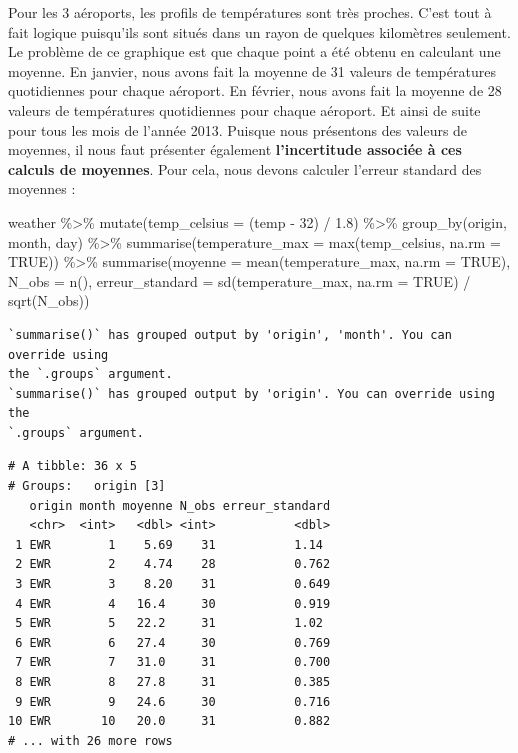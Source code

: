 \documentclass[
  a4paper,
  DIV=11,
  numbers=noendperiod,
  oneside]{scrreprt}
\newenvironment{Shaded}{}{}
\newcommand{\AttributeTok}[1]{\textcolor[rgb]{0.84,0.23,0.29}{#1}}
\newcommand{\ConstantTok}[1]{\textcolor[rgb]{0.00,0.36,0.77}{#1}}
\newcommand{\DecValTok}[1]{\textcolor[rgb]{0.00,0.36,0.77}{#1}}
\newcommand{\FloatTok}[1]{\textcolor[rgb]{0.00,0.36,0.77}{#1}}
\newcommand{\FunctionTok}[1]{\textcolor[rgb]{0.44,0.26,0.76}{#1}}
\newcommand{\NormalTok}[1]{\textcolor[rgb]{0.14,0.16,0.18}{#1}}
\newcommand{\SpecialCharTok}[1]{\textcolor[rgb]{0.00,0.36,0.77}{#1}}
\begin{document}
Pour les 3 aéroports, les profils de températures sont très proches.
C'est tout à fait logique puisqu'ils sont situés dans un rayon de
quelques kilomètres seulement. Le problème de ce graphique est que
chaque point a été obtenu en calculant une moyenne. En janvier, nous
avons fait la moyenne de 31 valeurs de températures quotidiennes pour
chaque aéroport. En février, nous avons fait la moyenne de 28 valeurs de
températures quotidiennes pour chaque aéroport. Et ainsi de suite pour
tous les mois de l'année 2013. Puisque nous présentons des valeurs de
moyennes, il nous faut présenter également \textbf{l'incertitude
associée à ces calculs de moyennes}. Pour cela, nous devons calculer
l'erreur standard des moyennes :

\begin{Shaded}
\begin{Highlighting}[]
\NormalTok{weather }\SpecialCharTok{\%\textgreater{}\%} 
  \FunctionTok{mutate}\NormalTok{(}\AttributeTok{temp\_celsius =}\NormalTok{ (temp }\SpecialCharTok{{-}} \DecValTok{32}\NormalTok{) }\SpecialCharTok{/} \FloatTok{1.8}\NormalTok{) }\SpecialCharTok{\%\textgreater{}\%} 
  \FunctionTok{group\_by}\NormalTok{(origin, month, day) }\SpecialCharTok{\%\textgreater{}\%} 
  \FunctionTok{summarise}\NormalTok{(}\AttributeTok{temperature\_max =} \FunctionTok{max}\NormalTok{(temp\_celsius, }\AttributeTok{na.rm =} \ConstantTok{TRUE}\NormalTok{)) }\SpecialCharTok{\%\textgreater{}\%} 
  \FunctionTok{summarise}\NormalTok{(}\AttributeTok{moyenne =} \FunctionTok{mean}\NormalTok{(temperature\_max, }\AttributeTok{na.rm =} \ConstantTok{TRUE}\NormalTok{),}
            \AttributeTok{N\_obs =} \FunctionTok{n}\NormalTok{(),}
            \AttributeTok{erreur\_standard =} \FunctionTok{sd}\NormalTok{(temperature\_max, }\AttributeTok{na.rm =} \ConstantTok{TRUE}\NormalTok{) }\SpecialCharTok{/} \FunctionTok{sqrt}\NormalTok{(N\_obs))}
\end{Highlighting}
\end{Shaded}

\begin{verbatim}
`summarise()` has grouped output by 'origin', 'month'. You can override using
the `.groups` argument.
`summarise()` has grouped output by 'origin'. You can override using the
`.groups` argument.
\end{verbatim}

\begin{verbatim}
# A tibble: 36 x 5
# Groups:   origin [3]
   origin month moyenne N_obs erreur_standard
   <chr>  <int>   <dbl> <int>           <dbl>
 1 EWR        1    5.69    31           1.14 
 2 EWR        2    4.74    28           0.762
 3 EWR        3    8.20    31           0.649
 4 EWR        4   16.4     30           0.919
 5 EWR        5   22.2     31           1.02 
 6 EWR        6   27.4     30           0.769
 7 EWR        7   31.0     31           0.700
 8 EWR        8   27.8     31           0.385
 9 EWR        9   24.6     30           0.716
10 EWR       10   20.0     31           0.882
# ... with 26 more rows
\end{verbatim}
\end{document}
